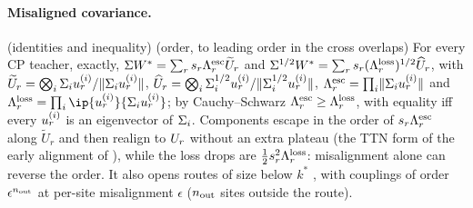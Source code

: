 \paragraph{Misaligned covariance.} \proven{} (identities and inequality) \derived{} (order, to leading
order in the cross overlaps) \newresult{} For every CP teacher, exactly,
$\Sigma W^{*}=\sum_rs_{r}\Lambda^{\rm esc}_r\widetilde U_r$ and $\Sigma^{1/2}W^{*}=\sum_rs_{r}(\Lambda^{\rm loss}_r)^{1/2}\widehat U_r$, with
$\widetilde U_r=\bigotimes_i\Sigma_{i}u_{r}^{(i)}/\lVert\Sigma_{i}u_{r}^{(i)}\rVert$, $\widehat U_r=\bigotimes_i\Sigma_{i}^{1/2}u_{r}^{(i)}/\lVert\Sigma_{i}^{1/2}u_{r}^{(i)}\rVert$,
$\Lambda^{\rm esc}_r=\prod_i\lVert\Sigma_{i}u_{r}^{(i)}\rVert$ and $\Lambda^{\rm loss}_r=\prod_i\ip{\fac ri}{\Sigi i\fac ri}$; by Cauchy--Schwarz
$\Lambda^{\rm esc}_r\ge\Lambda^{\rm loss}_r$, with equality iff every $u_{r}^{(i)}$ is an eigenvector of $\Sigma_{i}$. Components escape in the order of $s_{r}\Lambda^{\rm esc}_r$ along $\widetilde U_r$
and then realign to $U_{r}$ without an extra plateau (the TTN form of the early alignment of
\citealp{atanasov2022neural}), while the loss drops are $\frac12s_{r}^2\Lambda^{\rm loss}_r$: misalignment alone can
reverse the order. It also opens routes of size below $k^*$ \derived, with couplings of order $\epsilon^{n_{\rm out}}$ at
per-site misalignment $\epsilon$ ($n_{\rm out}$ sites outside the route).

